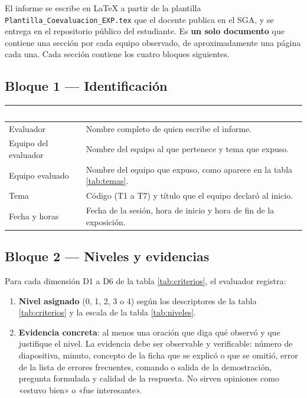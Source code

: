 \documentclass[11pt,a4paper]{article}
\newcommand{\hdr}[1]{\textcolor{white}{\textbf{#1}}}
\begin{document}
El informe se escribe en \LaTeX{} a partir de la plantilla \texttt{Plantilla\_Coevaluacion\_EXP.tex} que el docente publica en el SGA, y se entrega en el repositorio público del estudiante. Es \textbf{un solo documento} que contiene una sección por cada equipo observado, de aproximadamente una página cada una. Cada sección contiene los cuatro bloques siguientes.

\subsection{Bloque 1 --- Identificación}

{\small
\begin{xltabular}{\linewidth}{@{}L{5.0cm}Y@{}}
	\toprule
	\hdr{Campo} & \hdr{Descripción} \\
	\midrule
	\endhead
	Evaluador & Nombre completo de quien escribe el informe. \\
	Equipo del evaluador & Nombre del equipo al que pertenece y tema que expuso. \\
	Equipo evaluado & Nombre del equipo que expuso, como aparece en la tabla \ref{tab:temas}. \\
	Tema & Código (T1 a T7) y título que el equipo declaró al inicio. \\
	Fecha y horas & Fecha de la sesión, hora de inicio y hora de fin de la exposición. \\
	\bottomrule
\end{xltabular}
}

\subsection{Bloque 2 --- Niveles y evidencias}

Para cada dimensión D1 a D6 de la tabla \ref{tab:criterios}, el evaluador registra:
\begin{enumerate}
	\item \textbf{Nivel asignado} (0, 1, 2, 3 o 4) según los descriptores de la tabla \ref{tab:criterios} y la escala de la tabla \ref{tab:niveles}.
	\item \textbf{Evidencia concreta}: al menos una oración que diga qué observó y que justifique el nivel. La evidencia debe ser observable y verificable: número de diapositiva, minuto, concepto de la ficha que se explicó o que se omitió, error de la lista de errores frecuentes, comando o salida de la demostración, pregunta formulada y calidad de la respuesta. No sirven opiniones como «estuvo bien» o «fue interesante».
\end{enumerate}
\end{document}
